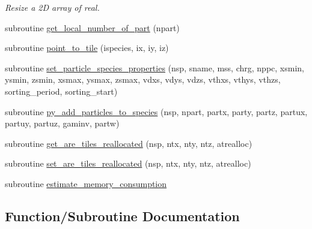 \begin{DoxyCompactItemize}
\begin{DoxyCompactList}\small\item\em Resize a 2D array of real. \end{DoxyCompactList}\item 
subroutine \hyperlink{namespacetiling_af9f6fdf5c755688f10dc74ed3c363d85}{get\+\_\+local\+\_\+number\+\_\+of\+\_\+part} (npart)
\item 
subroutine \hyperlink{namespacetiling_a875e1671637fb100355fe099ef2a4f63}{point\+\_\+to\+\_\+tile} (ispecies, ix, iy, iz)
\item 
subroutine \hyperlink{namespacetiling_a832a380c64af7fb0611b3528b1b28ef2}{set\+\_\+particle\+\_\+species\+\_\+properties} (nsp, sname, mss, chrg, nppc, xsmin, ysmin, zsmin, xsmax, ysmax, zsmax, vdxs, vdys, vdzs, vthxs, vthys, vthzs, sorting\+\_\+period, sorting\+\_\+start)
\item 
subroutine \hyperlink{namespacetiling_a7d2954e264909ff996bff6096932a53d}{py\+\_\+add\+\_\+particles\+\_\+to\+\_\+species} (nsp, npart, partx, party, partz,                                                       partux, partuy, partuz, gaminv, partw)
\item 
subroutine \hyperlink{namespacetiling_a74f93e807809bce73965e51431a8f8c7}{get\+\_\+are\+\_\+tiles\+\_\+reallocated} (nsp, ntx, nty, ntz, atrealloc)
\item 
subroutine \hyperlink{namespacetiling_a9ac073551919a3ca368f58e56b9370e6}{set\+\_\+are\+\_\+tiles\+\_\+reallocated} (nsp, ntx, nty, ntz, atrealloc)
\item 
subroutine \hyperlink{namespacetiling_a535146a13d8c0743eba14d150ca49199}{estimate\+\_\+memory\+\_\+consumption}
\end{DoxyCompactItemize}


\subsection{Function/\+Subroutine Documentation}
